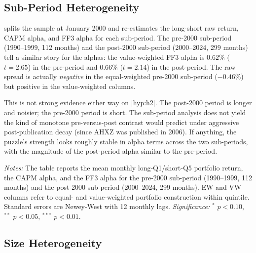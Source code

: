 \documentclass[12pt]{article}
\newcommand{\1}[1]{\mathds{1}\left[#1\right]}
\begin{document}
\subsection{Sub-Period Heterogeneity}

 splits the sample at January 2000 and re-estimates the
long-short raw return, CAPM alpha, and FF3 alpha for each sub-period.
The pre-2000 sub-period (1990--1999, 112 months) and the post-2000 sub-period
(2000--2024, 299 months) tell a similar story for the alphas: the
value-weighted FF3 alpha is $0.62\%$ ($t=2.65$) in the pre-period and
$0.66\%$ ($t=2.14$) in the post-period. The raw spread is actually \emph{negative}
in the equal-weighted pre-2000 sub-period ($-0.46\%$) but positive in the
value-weighted columns.

This is not strong evidence either way on \cref{hyp:h2}. The post-2000
period is longer and noisier; the pre-2000 period is short. The
sub-period analysis does not yield the kind of monotone pre-versus-post
contrast \citet{mclean2016does} would predict under aggressive
post-publication decay (since AHXZ was published in 2006). If anything, the
puzzle's strength looks roughly stable in alpha terms across the two
sub-periods, with the magnitude of the post-period alpha similar to the
pre-period.

\begin{table}[H]
\centering
\begin{threeparttable}
\caption{Sub-period heterogeneity: pre- vs.\ post-2000}\label{tab:subperiods}
\small

\begin{tablenotes}\small
\item \textit{Notes:} The table reports the mean monthly long-Q1/short-Q5
portfolio return, the CAPM alpha, and the FF3 alpha for the pre-2000
sub-period (1990--1999, 112 months) and the post-2000 sub-period (2000--2024,
299 months). EW and VW columns refer to equal- and value-weighted portfolio
construction within quintile. Standard errors are Newey-West with 12
monthly lags. \emph{Significance:} $^{*}$ $p<0.10$, $^{**}$ $p<0.05$,
$^{***}$ $p<0.01$.
\end{tablenotes}
\end{threeparttable}
\end{table}

\subsection{Size Heterogeneity}
\end{document}

